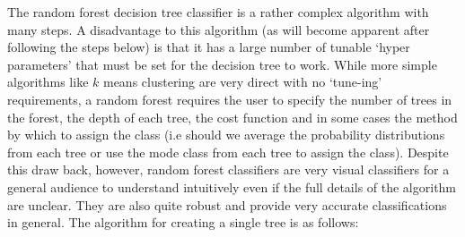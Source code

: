 \documentclass[10pt]{article}
\begin{document}
The random forest decision tree classifier is a rather complex algorithm with many steps. A disadvantage to this algorithm (as will become apparent after following the steps below) is that it has a large number of tunable `hyper parameters' that must be set for the decision tree to work. While more simple algorithms like $k$ means clustering are very direct with no `tune-ing' requirements, a random forest requires the user to specify the number of trees in the forest, the depth of each tree, the cost function and in some cases the method by which to assign the class (i.e should we average the probability distributions from each tree or use the mode class from each tree to assign the class). Despite this draw back, however, random forest classifiers are very visual classifiers for a general audience to understand intuitively even if the full details of the algorithm are unclear. They are also quite robust and provide very accurate classifications in general. The algorithm for creating a single tree is as follows:
\end{document}
